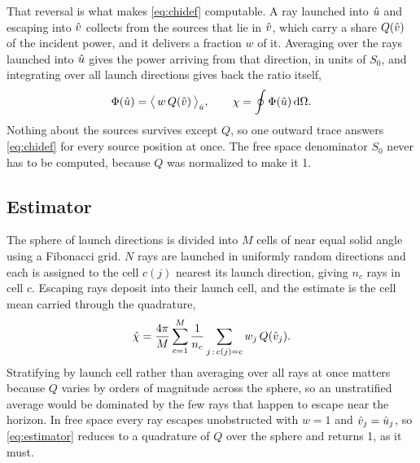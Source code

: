 That reversal is what makes \eqref{eq:chidef} computable. A ray launched into
$\hat{u}$ and escaping into $\hat{v}$ collects from the sources that lie in $\hat{v}$,
which carry a share $Q(\hat{v})$ of the incident power, and it delivers a fraction
$w$ of it. Averaging over the rays launched into $\hat{u}$ gives the power arriving
from that direction, in units of $S_0$, and integrating over all launch
directions gives back the ratio itself,
\begin{equation}
  \Phi(\hat{u}) = \big\langle\, w \, Q(\hat{v}) \,\big\rangle_{\hat{u}} , \qquad
  \chi = \oint \Phi(\hat{u}) \,\mathrm{d}\Omega .
  \label{eq:chi}
\end{equation}
Nothing about the sources survives except $Q$, so one outward trace answers
\eqref{eq:chidef} for every source position at once. The free space denominator
$S_0$ never has to be computed, because $Q$ was normalized to make it 1.

\subsection{Estimator}
\label{sec:estimator}

The sphere of launch directions is divided into $M$ cells of near equal solid
angle using a Fibonacci grid. $N$ rays are launched in uniformly random
directions and each is assigned to the cell $c(j)$ nearest its launch direction,
giving $n_c$ rays in cell $c$. Escaping rays deposit into their launch cell, and
the estimate is the cell mean carried through the quadrature,
\begin{equation}
  \hat{\chi} = \frac{4\pi}{M} \sum_{c=1}^{M} \frac{1}{n_c}
  \sum_{j\,:\,c(j)=c} w_j \, Q(\hat{v}_j) .
  \label{eq:estimator}
\end{equation}
Stratifying by launch cell rather than averaging over all rays at once matters
because $Q$ varies by orders of magnitude across the sphere, so an unstratified
average would be dominated by the few rays that happen to escape near the
horizon. In free space every ray escapes unobstructed with $w = 1$ and
$\hat{v}_j = \hat{u}_j$, so \eqref{eq:estimator} reduces to a quadrature of $Q$ over
the sphere and returns 1, as it must.


